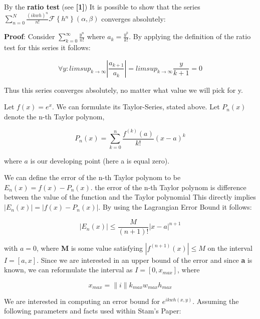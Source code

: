 
By the \textbf{ratio test} (see \textbf{{[}1{]}}) 
It is possible to show that the series $\sum_{n=0}^{N}\frac{(ikwh)^{n}}{n!}\mathcal{F}\left\{ h{}^{n}\right\} (\alpha,\beta)$ converges absolutely:

\textbf{Proof}: Consider $\sum_{k=0}^{\infty}\frac{y^{n}}{n!}$ where
$a_{k}=\frac{y^{k}}{k!}$. By applying the definition of the ratio test for this series it follows: 

\begin{equation}
 \forall y:limsup_{k\rightarrow\infty}|\frac{a_{k+1}}{a_{k}}|=limsup_{k\rightarrow\infty}\frac{y}{k+1}=0 
\end{equation}

Thus this series converges absolutely, no matter what value we will
pick for y.

Let $f(x)=e^{x}$. We can formulate its Taylor-Series, stated above.
Let $P_{n}(x)$denote the n-th Taylor polynom, 

\begin{equation}
 P_{n}(x)=\sum_{k=0}^{n}\frac{f^{(k)}(a)}{k!}(x-a)^{k}
\end{equation}

where $a$ is our developing point (here a is equal zero). 

We can define the error of the n-th Taylor polynom to be $E_{n}(x)=f(x)-P_{n}(x)$.
the error of the n-th Taylor polynom is difference between the value of the function and the Taylor polynomial
This directly implies $|E_{n}(x)|=|f(x)-P_{n}(x)|$. By using the Lagrangian Error Bound it follows: 

\begin{equation}
 |E_{n}(x)|\leq\frac{M}{(n+1)!}|x-a|^{n+1} 
\end{equation}

with $a=0$, where \textbf{M} is some value satisfying $|f^{(n+1)}(x)|\leq M$ on the interval $I=[a,x]$. Since we are interested in an upper bound of the error and since \textbf{a} is known, we can reformulate the interval as $I=[0,x_{max}]$, where 

\begin{equation}
 x_{max} = \|i\| k_{max} w_{max} h_{max}
\end{equation}

We are interested in computing an error bound for $e^{ikwh(x,y)}$. Assuming the following parameters and facts used within Stam's Paper: 

